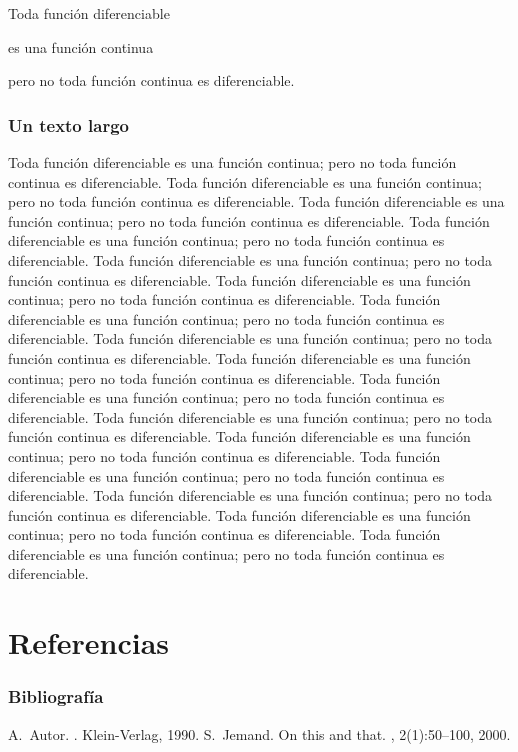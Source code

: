 \documentclass{beamer}
\begin{document}
\begin{frame}
 Toda función diferenciable \pause
 
 es una función continua \pause
 
 pero no toda función continua es diferenciable.
 
\end{frame}
\begin{frame}[allowframebreaks] 
\frametitle{Un texto largo}
 Toda función diferenciable  es una función continua; pero no toda función continua es diferenciable. Toda función diferenciable  es una función continua; pero no toda función continua es diferenciable. \framebreak Toda función diferenciable  es una función continua; pero no toda función continua es diferenciable. Toda función diferenciable  es una función continua; pero no toda función continua es diferenciable. Toda función diferenciable  es una función continua; pero no toda función continua es diferenciable. Toda función diferenciable  es una función continua; pero no toda función continua es diferenciable. Toda función diferenciable  es una función continua; pero no toda función continua es diferenciable.  Toda función diferenciable  es una función continua; pero no toda función continua es diferenciable. Toda función diferenciable  es una función continua; pero no toda función continua es diferenciable. Toda función diferenciable  es una función continua; pero no toda función continua es diferenciable.  Toda función diferenciable  es una función continua; pero no toda función continua es diferenciable. Toda función diferenciable  es una función continua; pero no toda función continua es diferenciable. Toda función diferenciable  es una función continua; pero no toda función continua es diferenciable. Toda función diferenciable  es una función continua; pero no toda función continua es diferenciable.
  Toda función diferenciable  es una función continua; pero no toda función continua es diferenciable. Toda función diferenciable  es una función continua; pero no toda función continua es diferenciable.
  \cite{Autor1990}
\end{frame}
\section{Referencias}

\begin{frame}[allowframebreaks]
  \frametitle{Bibliografía}
  \begin{thebibliography}{10}    
  \beamertemplatebookbibitems
    A.~Autor.
    .
    \newblock Klein-Verlag, 1990.
  \beamertemplatearticlebibitems
    S.~Jemand.
    \newblock On this and that.
    , 2(1):50--100, 2000.
  \end{thebibliography}
\end{frame}
\end{document}
